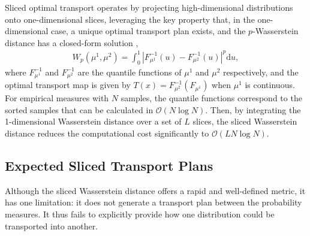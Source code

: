 Sliced optimal transport operates by projecting high-dimensional distributions onto one-dimensional slices, leveraging the key property that, in the one-dimensional case, a unique optimal transport plan exists, and the \( p \)-Wasserstein distance has a closed-form solution \cite{rabin2012wasserstein},
\begin{align}
    W_p(\mu^1, \mu^2)=\int_0^1 \left|F^{-1}_{\mu^1}(u)-F^{-1}_{\mu^2}(u)\right|^p\text{d}u,
\end{align}
where $F^{-1}_{\mu^1}$ and $F^{-1}_{\mu^2}$ are the quantile functions of $\mu^1$ and $\mu^2$ respectively, and the optimal transport map is given by $T(x)=F^{-1}_{\mu^2} (F_{\mu^1})$ when $\mu^1$ is continuous. For empirical measures with $N$ samples, the quantile functions correspond to the sorted samples that can be calculated in $\mathcal{O}(N\log N)$. Then, by integrating the 1-dimensional Wasserstein distance over a set of $L$ slices, the sliced Wasserstein distance reduces the computational cost significantly to $\mathcal{O}(LN\log N)$.

\subsection{Expected Sliced Transport Plans}
Although the sliced Wasserstein distance offers a rapid and well-defined metric, it has one limitation: it does not generate a transport plan between the probability measures. It thus fails to explicitly provide how one distribution could be transported into another. 

